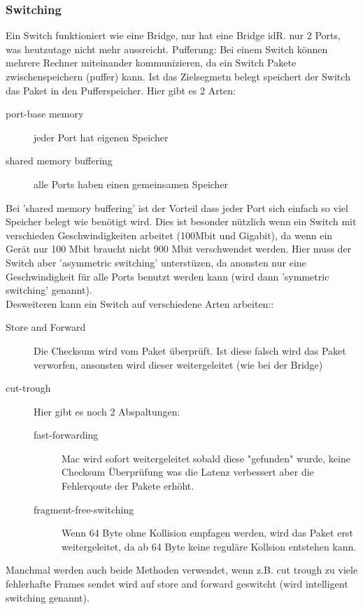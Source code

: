\documentclass[a4paper,10pt]{scrartcl}
\begin{document}
        \subsubsection{Switching}
            Ein Switch funktioniert wie eine Bridge, nur hat eine Bridge idR. nur 2 Ports, was heutzutage nicht mehr aussreicht. 
            Pufferung:
            Bei einem Switch können mehrere Rechner miteinander kommunizieren, da ein Switch Pakete zwischenspeichern (puffer) kann. Ist das Zielsegmetn belegt 
            speichert der Switch das Paket in den Pufferspeicher. Hier gibt es 2 Arten:
            \begin{description}
                \item[port-base memory] jeder Port hat eigenen Speicher 
                \item[shared memory buffering] alle Ports haben einen gemeinsamen Speicher
            \end{description}         
            Bei 'shared memory buffering' ist der Vorteil dass jeder Port sich einfach so viel Speicher belegt wie benötigt wird. Dies ist besonder nützlich wenn ein Switch mit
            verschieden Geschwindigkeiten arbeitet (100Mbit und Gigabit), da wenn ein Gerät nur 100 Mbit braucht nicht 900 Mbit verschwendet werden. Hier muss der Switch aber 'asymmetric switching'
            unterstüzen, da anonsten nur eine Geschwindigkeit für alle Ports benutzt werden kann (wird dann 'symmetric switching' genannt).\\
            Desweiteren kann ein Switch auf verschiedene Arten arbeiten::
            \begin{description}
                \item[Store and Forward] Die Checksum wird vom Paket überprüft. Ist diese falsch wird das Paket verworfen, ansonsten wird dieser weitergeleitet (wie bei der Bridge)
                \item[cut-trough] Hier gibt es noch 2 Abspaltungen:
                    \begin{description}
                        \item[fast-forwarding] Mac wird sofort weitergeleitet sobald diese "gefunden" wurde, keine Checksum Überprüfung was die Latenz verbessert aber die Fehlerqoute der Pakete erhöht. 
                        \item[fragment-free-switching] Wenn 64 Byte ohne Kollision empfagen werden, wird  das Paket erst weitergeleitet, da ab 64 Byte keine reguläre Kollsion entstehen kann.
                    \end{description}  
            \end{description} 
            Manchmal werden auch beide Methoden verwendet, wenn z.B. cut trough zu viele fehlerhafte Frames sendet wird auf store and forward geswitcht (wird intelligent switching genannt).
            
\end{document}
